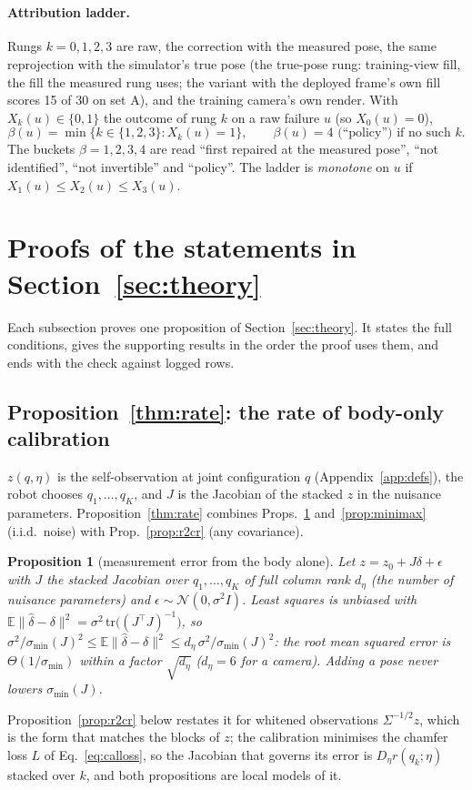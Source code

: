 \documentclass{article}
\newtheorem{proposition}{Proposition}
\newcommand{\ph}{\textsuperscript{\dag}}
\begin{document}
\paragraph{Attribution ladder\ph.} Rungs $k = 0,1,2,3$ are raw, the correction with the measured pose, the same
reprojection with the simulator's true pose (the true-pose rung: training-view fill, the fill the measured
rung uses; the variant with the deployed frame's own fill scores 15 of 30 on set A), and the training camera's own
render. With $X_k(u) \in \{0,1\}$ the outcome of rung $k$ on a raw failure $u$ (so $X_0(u) = 0$),
\begin{equation}
\beta(u) = \min\{k \in \{1,2,3\} : X_k(u) = 1\}, \qquad \beta(u) = 4 \text{ (``policy'') if no such } k .
\label{eq:bucket}
\end{equation}
The buckets $\beta = 1,2,3,4$ are read ``first repaired at the measured pose'', ``not identified'', ``not invertible'' and
``policy''. The ladder is \emph{monotone} on $u$ if $X_1(u) \le X_2(u) \le X_3(u)$.

\section{Proofs of the statements in Section~\ref{sec:theory}}
\label{app:proofs}
Each subsection proves one proposition of Section~\ref{sec:theory}. It states the full conditions, gives the
supporting results in the order the proof uses them, and ends with the check against logged rows.

\subsection{Proposition~\ref{thm:rate}: the rate of body-only calibration}
\label{app:facts}
$z(q,\eta)$ is the self-observation at joint configuration $q$ (Appendix~\ref{app:defs}), the robot chooses
$q_1, \dots, q_K$, and $J$ is the Jacobian of the stacked $z$ in the nuisance parameters. Proposition~\ref{thm:rate}
combines Props.~\ref{prop:cr} and~\ref{prop:minimax} (i.i.d.\ noise) with Prop.~\ref{prop:r2cr} (any covariance).

\begin{proposition}[measurement error from the body alone]
\label{prop:cr}
Let $z = z_0 + J\delta + \epsilon$ with $J$ the stacked Jacobian over $q_1,\dots,q_K$ of full column rank $d_\eta$
(the number of nuisance parameters) and $\epsilon \sim \mathcal N(0,\sigma^2 I)$. Least squares is unbiased with
$\mathbb{E}\|\hat\delta - \delta\|^2 = \sigma^2\,\mathrm{tr}\big((J^\top J)^{-1}\big)$, so $\sigma^2/\sigma_{\min}(J)^2
\le \mathbb{E}\|\hat\delta-\delta\|^2 \le d_\eta\,\sigma^2/\sigma_{\min}(J)^2$: the root mean squared error is
$\Theta(1/\sigma_{\min})$ within a factor $\sqrt{d_\eta}$ ($d_\eta=6$ for a camera). Adding a pose never lowers
$\sigma_{\min}(J)$.
\end{proposition}
Proposition~\ref{prop:r2cr} below restates it for whitened observations $\Sigma^{-1/2}z$, which is the form that
matches the blocks of $z$; the calibration minimises the chamfer loss $L$ of Eq.~\ref{eq:calloss}, so the Jacobian that
governs its error is $D_\eta r(q_k;\eta)$ stacked over $k$, and both propositions are local models of it.
\end{document}
